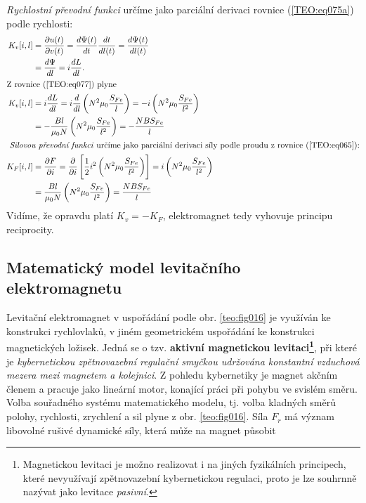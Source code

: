 {      \emph{Rychlostní převodní funkci} určíme jako parciální derivaci rovnice (\ref{TEO:eq075a}) 
      podle rychlosti: 
      \begin{align}
        K_v[i,l] &= \dfrac{\partial u(t)}{\partial v(t)} = \dfrac{d \Psi(t)}{d t}\dfrac{d t}{d l(t)}          
                  = \dfrac{d \Psi(t)}{d l(t)}                                        \nonumber \\
                 &= \dfrac{d \Psi}{d l} = i\dfrac{d L}{d l}.\label{TEO:eq077} \\
        \shortintertext{Z rovnice (\ref{TEO:eq077}) plyne}
        K_v[i,l] &= i\dfrac{d L}{d l} = i\dfrac{d  }{d l}\left(N^2\mu_0\frac{S_{Fe}}{l}\right) 
                  = - i\left(N^2\mu_0\frac{S_{Fe}}{l^2}\right)                  \nonumber \\
                 &= -\frac{Bl}{\mu_0N}\left(N^2\mu_0\frac{S_{Fe}}{l^2}\right)
                  = - \frac{NBS_{Fe}}{l} \label{TEO:eq078}   \\ 
        \shortintertext{\emph{ Silovou převodní funkci} určíme jako parciální derivaci síly podle 
        proudu z rovnice (\ref{TEO:eq065}):}
        K_F[i,l] &= \dfrac{\partial F}{\partial i} = \dfrac{\partial  
        }{\partial i}\left[\frac{1}{2}i^2\left(N^2\mu_0\frac{S_{Fe}}{l^2}\right)\right]  
                  = i\left(N^2\mu_0\frac{S_{Fe}}{l^2}\right)                    \nonumber \\
                 &= \frac{Bl}{\mu_0N}\left(N^2\mu_0\frac{S_{Fe}}{l^2}\right) 
                  = \frac{NBS_{Fe}}{l} \label{TEO:eq079}
      \end{align}
      Vidíme, že opravdu platí \(K_v = - K_F\), elektromagnet tedy vyhovuje principu reciprocity. 
      
    \subsection{Matematický model levitačního elektromagnetu}
      Levitační elektromagnet v uspořádání podle obr. \ref{teo:fig016} je využíván ke konstrukci 
      rychlovlaků, v jiném geometrickém uspořádání ke konstrukci magnetických ložisek. Jedná se o 
      tzv. \textbf{aktivní magnetickou levitaci\footnote{Magnetickou levitaci je možno realizovat i 
      na jiných fyzikálních principech, které nevyužívají zpětnovazební kybernetickou regulaci, 
      proto je lze souhrnně nazývat jako levitace \emph{pasivní}.}}, při které je 
      \emph{kybernetickou zpětnovazební regulační smyčkou udržována konstantní vzduchová mezera 
      mezi magnetem a kolejnici}. Z pohledu kybernetiky je magnet akčním členem a pracuje jako 
      lineární motor, konající práci při pohybu ve svislém směru. Volba souřadného systému 
      matematického modelu, tj. volba kladných směrů polohy, rychlosti, zrychlení a sil plyne z 
      obr. \ref{teo:fig016}. Síla \(F_r\) má význam libovolné rušivé dynamické síly, která může na 
      magnet působit
      
}
